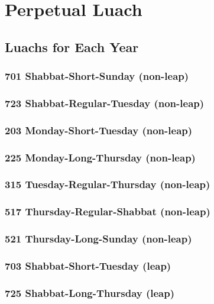 \part{Perpetual Luach}



\chapter{Luachs for Each Year}
\section{701 Shabbat-Short-Sunday (non-leap)}
\label{701}

\section{723 Shabbat-Regular-Tuesday (non-leap)}
\label{723}

\section{203 Monday-Short-Tuesday (non-leap)}
\label{702}

\section{225 Monday-Long-Thursday (non-leap)}
\label{225}

\section{315 Tuesday-Regular-Thursday (non-leap)}
\label{315}

\section{517 Thursday-Regular-Shabbat (non-leap)}
\label{517}

\section{521 Thursday-Long-Sunday (non-leap)}
\label{521}

\section{703 Shabbat-Short-Tuesday (leap)}
\label{703}

\section{725 Shabbat-Long-Thursday (leap)}
\label{725}


